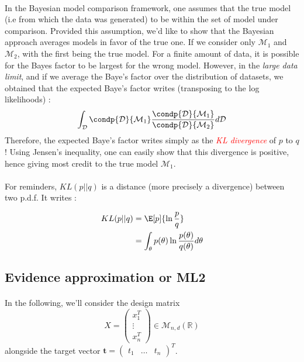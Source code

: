 \documentclass[a4paper]{article}
\begin{document}
{{			\paragraph{} In the Bayesian model comparison framework, one assumes that the true model (i.e from which the data was generated) to be within the set of model under comparison. Provided this assumption, we'd like to show that the Bayesian approach averages models in favor of the true one. 
			If we consider only $\mathcal{M}_1$ and $\mathcal{M}_2$, with the first being the true model. For a finite amount of data, it is possible for the Bayes factor to be largest for the wrong model. However, in the \emph{large data limit},  and if we average the Baye's factor over the distribution of datasets, we obtained that the expected Baye's factor writes (transposing to the log likelihoods) : 
			\begin{equation}
				\int_\mathcal{D} \condp{\mathcal{D}}{\mathcal{M}_1} \frac{\condp{\mathcal{D}}{\mathcal{M}_1}}{\condp{\mathcal{D}}{\mathcal{M}_2}} d\mathcal{D}
			\end{equation}
			Therefore, the expected Baye's factor writes simply as the \textcolor{red}{\emph{KL divergence}} of $p$ to $q$ ! Using Jensen's inequality, one can easily show that this divergence is positive, hence giving most credit to the true model $\mathcal{M}_1$. 
			
			\paragraph{} For reminders, $KL(p\vert \vert q)$ is a distance (more precisely a divergence) between two p.d.f. It writes : 
		\vspace{5pt}
		
		{
			\begin{equation}
				\begin{aligned}
					KL(p\vert\vert q) &= \E[p]{\ln\frac{p}{q}} \\
							          &= \int_\theta p(\theta)\ln\frac{p(\theta)}{q(\theta)}d\theta
				\end{aligned}
			\end{equation}
		}
		}
		
		\subsection{Evidence approximation or ML2}
		{
			\paragraph{} In the following, we'll consider the design matrix 
			$$
				X = \begin{pmatrix} x_1^T \\ \vdots \\ x_n^T\end{pmatrix} \in\mathcal{M}_{n,d}(\mathbb{R})
			$$
			alongside the target vector $\boldsymbol{t} = \begin{pmatrix} t_1 & \hdots & t_n\end{pmatrix}^T$. 
			
}}
\end{document}
